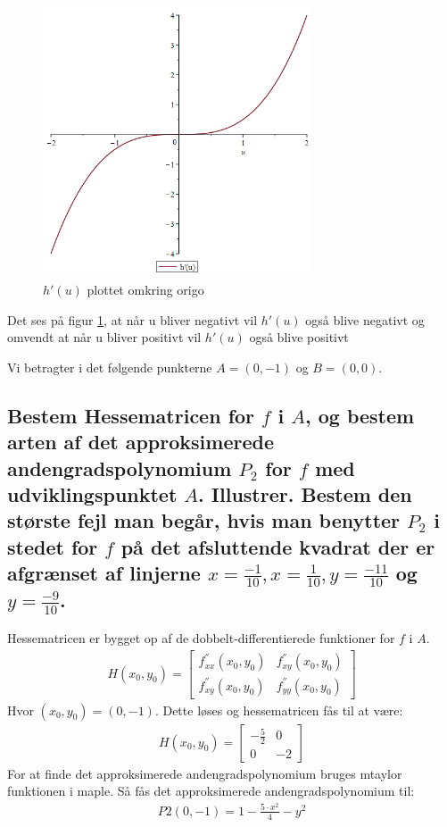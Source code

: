 \begin{figure}[htp]
    \centering
    \includegraphics[width=8cm]{diffh.png}
        \caption{$h'(u)$ plottet omkring origo}
    \label{diffh}
\end{figure}
\newpage

Det ses på figur \ref{diffh}, at når u bliver negativt vil $h'(u)$ også blive negativt og omvendt at når u bliver positivt vil $h'(u)$ også blive positivt



Vi betragter i det følgende punkterne $A = (0,-1)$ og $B=(0,0)$.

\subsection{Bestem Hessematricen for $f$ i $A$, og bestem arten af det approksimerede andengradspolynomium $P_2$ for $f$ med udviklingspunktet $A$. Illustrer. Bestem den største fejl man begår, hvis man benytter $P_2$ i stedet for $f$ på det afsluttende kvadrat der er afgrænset af linjerne $x=\frac{-1}{10},x=\frac{1}{10},y=\frac{-11}{10}$ og $y=\frac{-9}{10}$.}

Hessematricen er bygget op af de dobbelt-differentierede funktioner for $f$ i $A$. 
\begin{align}
    H(x_0,y_0)= 
    \left[
    \begin{array}{cc}
        f^{''}_{xx}(x_0,y_0) & f^{''}_{xy}(x_0,y_0)\\f^{''}_{xy}(x_0,y_0) & f^{''}_{yy}(x_0,y_0)
    \end{array}
\right] 
\end{align}
Hvor $(x_0,y_0)=(0,-1)$.
Dette løses og hessematricen fås til at være:
\begin{align}
    H(x_0,y_0)= 
    \left[
    \begin{array}{cc}
        -\frac{5}{2} & 0\\0 & -2
    \end{array}
\right] 
\end{align}
For at finde det approksimerede andengradspolynomium bruges mtaylor funktionen i maple. Så fås det approksimerede andengradspolynomium til:
\begin{align}
    P2(0,-1) = 1-\frac{5\cdot x^2}{4} - y^2
\end{align}

